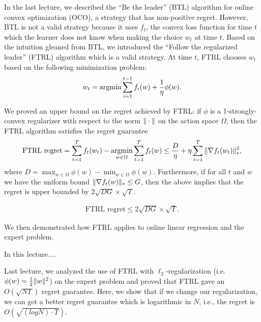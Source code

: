 \setcounter{section}{0}


In the last lecture, we described the ``Be the leader'' (BTL) algorithm for online convex optimization (OCO), a strategy that has non-positive regret. However, BTL is not a valid strategy because it uses $f_t$, the convex loss function for time $t$ which the learner does not know when making the choice $w_t$ at time $t$. Based on the intuition gleaned from BTL, we introduced the ``Follow the regularized leader'' (FTRL) algorithm which is a valid strategy. At time $t$, FTRL chooses $w_t$ based on the following minimization problem:
\begin{align}
w_t = \operatorname*{\textup{argmin}} \sum_{i=1}^{t-1} f_i(w) + \frac{1}{\eta} \phi(w).
\end{align}

We proved an upper bound on the regret achieved by FTRL: if $\phi$ is a 1-strongly-convex regularizer with respect to the norm $\|\cdot\|$ on the action space $\Omega$, then the FTRL algorithm satisfies the regret guarantee
\begin{align}
\text{FTRL regret} = \sum_{t = 1}^T f_t(w_t) - \operatorname*{\textup{argmin}}_{w \in \Omega} \sum_{t = 1}^T f_t(w)  \leq \frac{D}{\eta} + \eta \sum_{t = 1}^T \|\nabla f_t(w_t)\|_*^2,
\end{align}
where $D = \max_{w \in \Omega} \phi(w) - \min_{w \in \Omega} \phi(w)$. Furthermore, if for all $t$ and $w$ we have the uniform bound $\|\nabla f_t(w)\|_* \leq G$, then the above implies that the regret is upper bounded by $2 \sqrt{D G} \times \sqrt{T}$. 

\begin{align}\label{lec17:eqn:ftrl-regret-ub}
\text{FTRL regret} \leq 2 \sqrt{D G} \times \sqrt{T}.
\end{align}

We then demonstrated how FTRL applies to online linear regression and the expert problem.

In this lecture....


Last lecture, we analyzed the use of FTRL with $\ell_2$-regularization (i.e. $\phi(w) = \frac{1}{2}\|w\|^2$) on the expert problem and proved that FTRL gave an $O(\sqrt{NT})$ regret guarantee. Here, we show that if we change our regularization, we can get a better regret guarantee which is logarithmic in $N$, i.e., the regret is $O(\sqrt{(log N) \cdot T})$.

